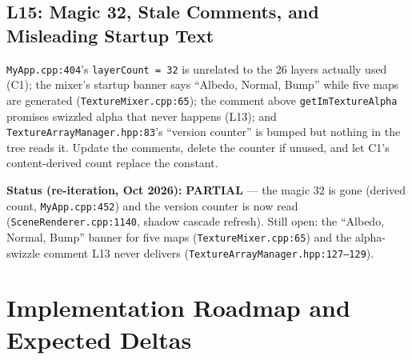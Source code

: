 \documentclass[11pt,a4paper]{article}
\begin{document}
\subsection{L15: Magic 32, Stale Comments, and Misleading Startup Text}
\label{sec:l15}

\texttt{MyApp.cpp:404}'s \texttt{layerCount = 32} is unrelated to the 26 layers
actually used (C1); the mixer's startup banner says ``Albedo, Normal, Bump''
while five maps are generated (\texttt{TextureMixer.cpp:65}); the comment above
\texttt{getImTextureAlpha} promises swizzled alpha that never happens (L13);
and \texttt{TextureArrayManager.hpp:83}'s ``version counter'' is bumped but
nothing in the tree reads it. Update the comments, delete the counter if
unused, and let C1's content-derived count replace the constant.

\textbf{Status (re-iteration, Oct 2026):} \textbf{PARTIAL} --- the magic 32 is
gone (derived count, \texttt{MyApp.cpp:452}) and the version counter is now
read (\texttt{SceneRenderer.cpp:1140}, shadow cascade refresh). Still open:
the ``Albedo, Normal, Bump'' banner for five maps
(\texttt{TextureMixer.cpp:65}) and the alpha-swizzle comment L13 never
delivers (\texttt{TextureArrayManager.hpp:127--129}).

\section{Implementation Roadmap and Expected Deltas}
\end{document}
